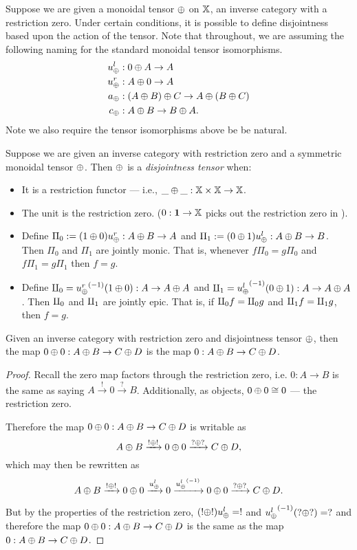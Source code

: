 Suppose we are given a monoidal tensor $\oplus$ on $\mathbb{X}$, an inverse category with a restriction zero. Under
certain conditions, it is possible to define disjointness based upon the action of the tensor. Note
that throughout, we are assuming the following naming for the standard monoidal tensor isomorphisms.
\begin{align*}
   u_{\oplus}^l &: 0 \oplus A \to A\\
   u_{\oplus}^r &: A \oplus 0 \to A\\
   a_\oplus &: (A \oplus B) \oplus C \to A \oplus (B \oplus C) \\
   c_\oplus &: A \oplus B \to B \oplus A.
 \end{align*}
Note we also require the tensor isomorphisms above be be natural.

\begin{definition}\label{def:disjointness_tensor}
  Suppose we are given an inverse category \X with restriction zero and a symmetric monoidal tensor
  $\oplus$. Then $\oplus$ is a \emph{disjointness tensor} when:
  \begin{itemize}
    \item It is a restriction functor --- i.e., $\_ \oplus \_ : \mathbb{X} \times \mathbb{X} \to \mathbb{X}$.
    \item The unit is the restriction zero. ($0 : \boldsymbol{1}\to \mathbb{X}$ picks out the restriction
    zero in \X).
    \item Define $\Pi_0 := (1\oplus0)u_{\oplus}^r: A\oplus B \to A$ and $\Pi_1 := (0\oplus1)u_{\oplus}^l:A\oplus B \to B$. Then
      $\Pi_0$  and $\Pi_1$ are jointly monic. That is, whenever $f\Pi_0 = g \Pi_0$ and
      $f\Pi_1 = g\Pi_1$ then $f = g$.
    \item Define $\amalg_{0} = {u_{\oplus}^r}^{(-1)}(1\oplus0):A\to A\oplus A$ and $\amalg_{1} = {u_{\oplus}^l}^{(-1)}(0\oplus1): A\to A\oplus A$. Then
      $\amalg_{0}$ and $\amalg_{1}$ are jointly epic. That is, if $\amalg_{0} f = \amalg_{0} g$ and $\amalg_{1} f = \amalg_{1} g$, then
      $f = g$.
  \end{itemize}

\end{definition}

\begin{lemma}\label{lem:zero_plus_zero_is_zero}
  Given an inverse category \X with restriction zero and disjointness tensor $\oplus$, then the map
  $0\oplus0: A\oplus B \to C\oplus D$ is the map $0: A\oplus B \to C\oplus D$.
\end{lemma}
\begin{proof}
  Recall the zero map factors through the restriction zero, i.e. $0:A \to B$ is the same as
  saying $A\xrightarrow{!} 0 \xrightarrow{?}B$. Additionally, as objects, $0\oplus0 \cong 0$ ---
  the restriction zero.

  Therefore the map $0\oplus0: A\oplus B \to C\oplus D$ is writable as
  \[
    A\oplus B \xrightarrow{!\oplus!}0\oplus0  \xrightarrow{?\oplus?} C\oplus D,
  \]
  which may then be rewritten as
  \[
    A\oplus B \xrightarrow{!\oplus!}0\oplus0 \xrightarrow{u_{\oplus}^l} 0
      \xrightarrow{{u_{\oplus}^l}^{(-1)}} 0\oplus0 \xrightarrow{?\oplus?} C\oplus D.
  \]

  But by the properties of the restriction zero, $(!\oplus!) u_{\oplus}^l = !$ and ${u_{\oplus}^l}^{(-1)}(?\oplus?) = ?$
  and therefore the map $0\oplus0: A\oplus B \to C\oplus D$ is the same as the map $0: A\oplus B \to C\oplus D$.
\end{proof}


